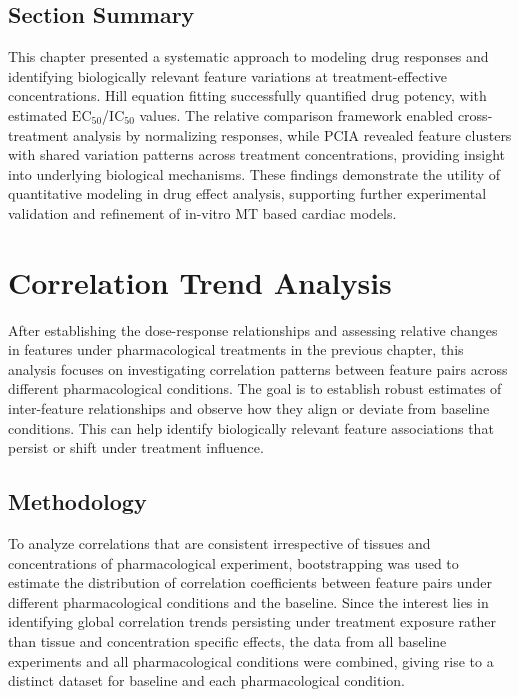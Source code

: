 \documentclass{report}
\begin{document}
        \subsection{Section Summary}
        This chapter presented a systematic approach to modeling drug responses and identifying biologically relevant feature variations at treatment-effective concentrations. Hill equation fitting successfully quantified drug potency, with estimated \(\text{EC}_{50}\)/\(\text{IC}_{50}\) values. The relative comparison framework enabled cross-treatment analysis by normalizing responses, while PCIA revealed feature clusters with shared variation patterns across treatment concentrations, providing insight into underlying biological mechanisms. These findings demonstrate the utility of quantitative modeling in drug effect analysis, supporting further experimental validation and refinement of in-vitro MT based cardiac models.
        
\newpage
\section{Correlation Trend Analysis}
    \label{correlation-trend}
    After establishing the dose-response relationships and assessing relative changes in features under pharmacological treatments in the previous chapter, this analysis focuses on investigating correlation patterns between feature pairs across different pharmacological conditions. The goal is to establish robust estimates of inter-feature relationships and observe how they align or deviate from baseline conditions. This can help identify biologically relevant feature associations that persist or shift under treatment influence.
    
    \subsection{Methodology}
    To analyze correlations that are consistent irrespective of tissues and concentrations of pharmacological experiment, bootstrapping was used to estimate the distribution of correlation coefficients between feature pairs under different pharmacological conditions and the baseline. Since the interest lies in identifying global correlation trends persisting under treatment exposure rather than tissue and concentration specific effects, the data from all baseline experiments and all pharmacological conditions were combined, giving rise to a distinct dataset for baseline and each pharmacological condition.
    
\end{document}
